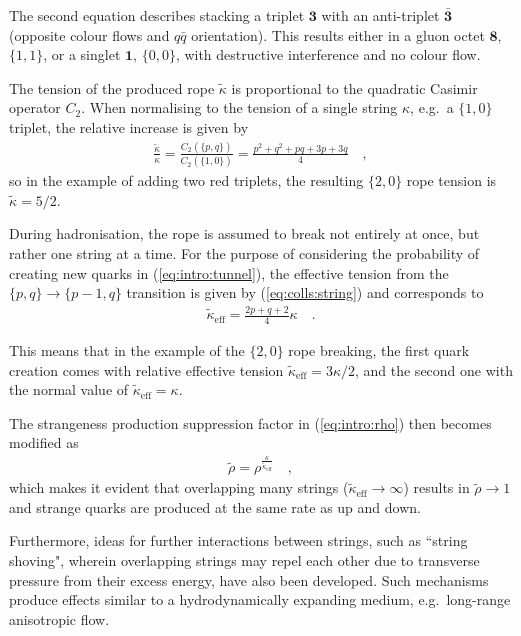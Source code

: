 The second equation describes stacking a triplet $\mathbf{3}$ with an anti-triplet $\mathbf{\bar{3}}$ (opposite colour flows and $q\bar{q}$ orientation). This results either in a gluon octet $\mathbf{8}$, $\{1,1\}$, or a singlet $\mathbf{1}$, $\{0,0\}$, with destructive interference and no colour flow.

The tension of the produced rope $\tilde{\kappa}$ is proportional to the quadratic Casimir operator $C_2$. When normalising to the tension of a single string $\kappa$, e.g.\ a $\{1,0\}$ triplet, the relative increase is given by
\begin{align}\label{eq:colls:string}
\frac{\tilde{\kappa}}{\kappa} = \frac{C_2( \{p,q\})}{C_2 ( \{1,0\})} = \frac{p^2+q^2+pq+3p+3q}{4} \quad ,
\end{align}
so in the example of adding two red triplets, the resulting $\{2,0\}$ rope tension is $\tilde{\kappa}=5/2$.

During hadronisation, the rope is assumed to break not entirely at once, but rather one string at a time. For the purpose of considering the probability of creating new quarks in (\ref{eq:intro:tunnel}), the effective tension from the $\{p,q\}\to \{p-1,q\}$ transition is given by (\ref{eq:colls:string}) and corresponds to
\begin{align}
\tilde{\kappa}_\mathrm{eff} = \frac{2p+q+2}{4}\kappa \quad.
\end{align}

This means that in the example of the $\{2,0\}$ rope breaking, the first quark creation comes with relative effective tension $\tilde{\kappa}_\mathrm{eff} = 3\kappa/2$, and the second one with the normal value of $\tilde{\kappa}_\mathrm{eff}=\kappa$.

The strangeness production suppression factor in (\ref{eq:intro:rho}) then becomes modified as
\begin{align}
\tilde{\rho} = \rho^{\frac{\kappa}{\tilde{\kappa}_\mathrm{eff}}} \quad ,
\end{align}
which makes it evident that overlapping many strings ($\tilde{\kappa}_\mathrm{eff} \to \infty$) results in $\tilde{\rho} \to 1$ and strange quarks are produced at the same rate as up and down. 

Furthermore, ideas for further interactions between strings, such as ``string shoving", wherein overlapping strings may repel each other due to transverse pressure from their excess energy, have also been developed. Such mechanisms produce effects similar to a hydrodynamically expanding medium, e.g.\ long-range anisotropic flow. \cite{bierlichShovingModelCollectivity2016}

